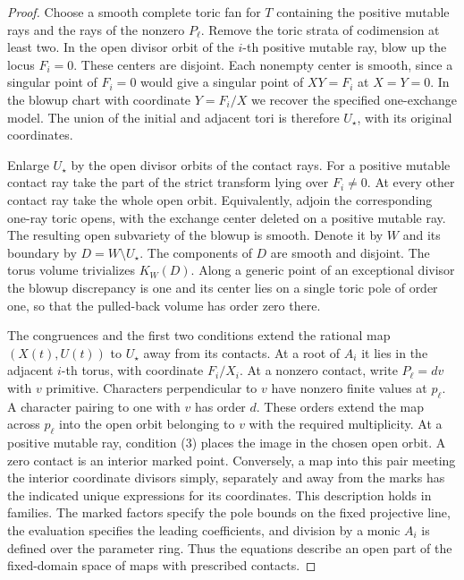 \documentclass[11pt,reqno]{amsart}
\numberwithin{equation}{section}
\theoremstyle{definition}
\theoremstyle{remark}
\begin{document}
\begin{proof}
Choose a smooth complete toric fan for \(T\) containing the positive
mutable rays and the rays of the nonzero \(P_\ell\). Remove the
toric strata of codimension at least two. In the open divisor orbit
of the \(i\)-th positive mutable ray, blow up the locus \(F_i=0\).
These centers are disjoint. Each nonempty center is smooth, since a
singular point of \(F_i=0\) would give a singular point of \(XY=F_i\)
at \(X=Y=0\). In the blowup chart with coordinate \(Y=F_i/X\) we
recover the specified one-exchange model. The union of the initial
and adjacent tori is therefore \(U_\star\), with its original
coordinates.

Enlarge \(U_\star\) by the open divisor orbits of the contact rays.
For a positive mutable contact ray take the part of the strict
transform lying over \(F_i\ne0\). At every other contact ray take the
whole open orbit. Equivalently, adjoin the corresponding one-ray
toric opens, with the exchange center deleted on a positive mutable
ray. The resulting open subvariety of the blowup is smooth. Denote
it by \(W\) and its boundary by \(D=W\setminus U_\star\). The
components of \(D\) are smooth and disjoint. The torus volume
trivializes \(K_W(D)\). Along a generic point of an exceptional
divisor the blowup discrepancy is one and its center lies on a
single toric pole of order one, so that the pulled-back volume has
order zero there.

The congruences and the first two conditions extend the
rational map \((X(t),U(t))\) to \(U_\star\) away from its contacts.
At a root of \(A_i\) it lies in the adjacent \(i\)-th torus, with
coordinate \(F_i/X_i\). At a nonzero contact, write \(P_\ell=dv\)
with \(v\) primitive. Characters perpendicular to \(v\) have nonzero
finite values at \(p_\ell\). A character pairing to one with \(v\)
has order \(d\). These orders extend the map across
\(p_\ell\) into the open orbit belonging to \(v\) with the required
multiplicity. At a positive mutable ray, condition (3) places the image in the chosen open orbit. A zero contact is an interior marked
point. Conversely, a map into this pair meeting the interior
coordinate divisors simply, separately and away from the marks
has the indicated unique expressions for its coordinates. This
description holds in families. The marked factors specify the pole
bounds on the fixed projective line, the evaluation specifies the
leading coefficients, and division by a monic \(A_i\) is defined
over the parameter ring. Thus the equations describe an open part
of the fixed-domain space of maps with prescribed contacts.


\end{proof}
\end{document}
